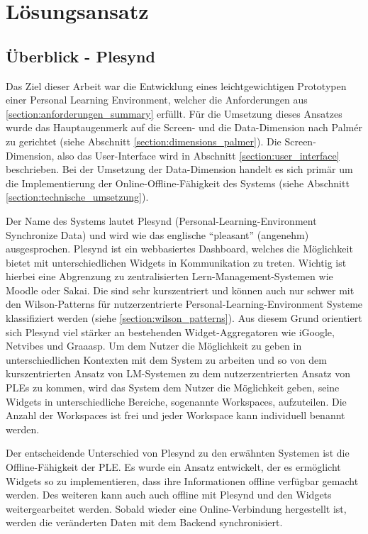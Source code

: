\chapter{Lösungsansatz} 
\label{chapter:Kapitel5}

\section{Überblick - Plesynd}
Das Ziel dieser Arbeit war die Entwicklung eines leichtgewichtigen Prototypen einer Personal Learning Environment, welcher die Anforderungen aus \ref{section:anforderungen_summary} erfüllt. Für die Umsetzung dieses Ansatzes wurde das Hauptaugenmerk auf die Screen- und die Data-Dimension nach Palmér zu gerichtet (siehe Abschnitt \ref{section:dimensions_palmer}). Die Screen-Dimension, also das User-Interface wird in Abschnitt \ref{section:user_interface} beschrieben. Bei der Umsetzung der Data-Dimension handelt es sich primär um die Implementierung der Online-Offline-Fähigkeit des Systems (siehe Abschnitt \ref{section:technische_umsetzung}).

Der Name des Systems lautet Plesynd (Personal-Learning-Environment Synchronize Data) und wird wie das englische "`pleasant"' (angenehm) ausgesprochen. Plesynd ist ein webbasiertes Dashboard, welches die Möglichkeit bietet mit unterschiedlichen Widgets in Kommunikation zu treten. Wichtig ist hierbei eine Abgrenzung zu zentralisierten Lern-Management-Systemen wie Moodle oder Sakai. Die sind sehr kurszentriert und können auch nur schwer mit den Wilson-Patterns für nutzerzentrierte Personal-Learning-Environment Systeme klassifiziert werden (siehe \ref{section:wilson_patterns}). Aus diesem Grund orientiert sich Plesynd viel stärker an bestehenden Widget-Aggregatoren wie iGoogle, Netvibes und Graaasp. Um dem Nutzer die Möglichkeit zu geben in unterschiedlichen Kontexten mit dem System zu arbeiten und so von dem kurszentrierten Ansatz von LM-Systemen zu dem nutzerzentrierten Ansatz von PLEs zu kommen, wird das System dem Nutzer die Möglichkeit geben, seine Widgets in unterschiedliche Bereiche, sogenannte Workspaces, aufzuteilen. Die Anzahl der Workspaces ist frei und jeder Workspace kann individuell benannt werden.

Der entscheidende Unterschied von Plesynd zu den erwähnten Systemen ist die Offline-Fähigkeit der PLE. Es wurde ein Ansatz entwickelt, der es ermöglicht Widgets so zu implementieren, dass ihre Informationen offline verfügbar gemacht werden. Des weiteren kann auch auch offline mit Plesynd und den Widgets weitergearbeitet werden. Sobald wieder eine Online-Verbindung hergestellt ist, werden die veränderten Daten mit dem Backend synchronisiert.

